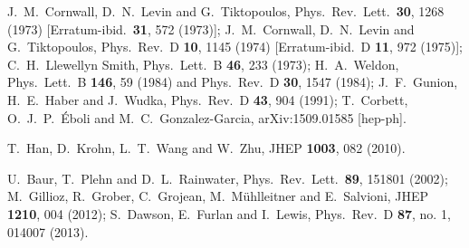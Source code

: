   J.~M.~Cornwall, D.~N.~Levin and G.~Tiktopoulos,
  Phys.\ Rev.\ Lett.\  {\bf 30}, 1268 (1973)
  [Erratum-ibid.\  {\bf 31}, 572 (1973)];
  J.~M.~Cornwall, D.~N.~Levin and G.~Tiktopoulos,
  Phys.\ Rev.\ D {\bf 10}, 1145 (1974)
  [Erratum-ibid.\ D {\bf 11}, 972 (1975)];
  C.~H.~Llewellyn Smith,
  Phys.\ Lett.\ B {\bf 46}, 233 (1973);
  H.~A.~Weldon,
  Phys.\ Lett.\ B {\bf 146}, 59 (1984)
  and
  Phys.\ Rev.\ D {\bf 30}, 1547 (1984);
  J.~F.~Gunion, H.~E.~Haber and J.~Wudka,
  Phys.\ Rev.\ D {\bf 43}, 904 (1991);
  T.~Corbett, O.~J.~P.~\'Eboli and M.~C.~Gonzalez-Garcia,
  arXiv:1509.01585 [hep-ph].

  T.~Han, D.~Krohn, L.~T.~Wang and W.~Zhu,
  JHEP {\bf 1003}, 082 (2010).

  U.~Baur, T.~Plehn and D.~L.~Rainwater,
  Phys.\ Rev.\ Lett.\  {\bf 89}, 151801 (2002); 
  M.~Gillioz, R.~Grober, C.~Grojean, M.~M\"uhlleitner and E.~Salvioni,
  JHEP {\bf 1210}, 004 (2012);
  S.~Dawson, E.~Furlan and I.~Lewis,
  Phys.\ Rev.\ D {\bf 87}, no. 1, 014007 (2013).
  
